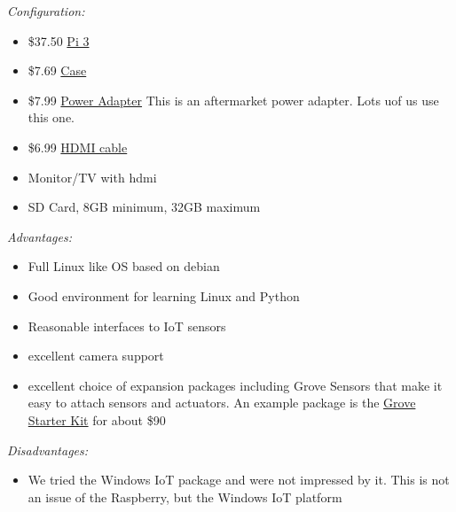 \emph{Configuration:}

\begin{itemize}

\item
  \$37.50
  \href{https://www.amazon.com/Raspberry-Model-A1-2GHz-64-bit-quad-core/dp/B01CD5VC92/ref=sr_1_1?s=pc\&ie=UTF8\&qid=1499251061\&sr=1-1\&keywords=raspberry+pi+3}{Pi
  3}
\item
  \$7.69
  \href{https://www.amazon.com/Eleduino-Raspberry-Model-Acrylic-Enclosure/dp/B01CQRROLW/ref=sr_1_7?s=electronics\&ie=UTF8\&qid=1499251106\&sr=1-7\&keywords=raspberry+pi+3+case}{Case}
\item
  \$7.99
  \href{https://www.amazon.com/Enokay-Supply-Raspberry-Charger-Adapter/dp/B01MZX466R/ref=sr_1_3?ie=UTF8\&qid=1498443576\&sr=8-3\&keywords=raspberry+pi+power+adapter+micro+usb+switch}{Power
  Adapter} This is an aftermarket power adapter. Lots uof us use this
  one.
\item
  \$6.99
  \href{https://www.amazon.com/AmazonBasics-High-Speed-HDMI-Cable-Standard/dp/B014I8SSD0/ref=sr_1_3?ie=UTF8\&qid=1499253502\&sr=8-3\&keywords=hdmi+cable}{HDMI
  cable}
\item
  Monitor/TV with hdmi
\item
  SD Card, 8GB minimum, 32GB maximum
\end{itemize}

\emph{Advantages:}

\begin{itemize}

\item
  Full Linux like OS based on debian
\item
  Good environment for learning Linux and Python
\item
  Reasonable interfaces to IoT sensors
\item
  excellent camera support
\item
  excellent choice of expansion packages including Grove Sensors that
  make it easy to attach sensors and actuators. An example package is
  the
  \href{https://www.amazon.com/GrovePi-Starter-Kit-Dexter-Industries/dp/B00TXTZ5SQ/ref=pd_lpo_vtph_147_bs_tr_img_1?_encoding=UTF8\&psc=1\&refRID=45QX6XSNZAG1NT8NES79}{Grove
  Starter Kit} for about \$90
\end{itemize}

\emph{Disadvantages:}

\begin{itemize}

\item
  We tried the Windows IoT package and were not impressed by it. This is
  not an issue of the Raspberry, but the Windows IoT platform
\end{itemize}

